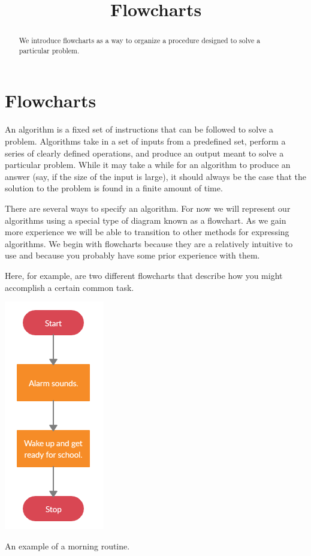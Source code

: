 \documentclass{ximera}
\title{Flowcharts}
\begin{document}
  
\begin{abstract}  
We introduce flowcharts as a way to organize a procedure designed to solve a particular problem.
\end{abstract}  
\maketitle

\section{Flowcharts}
An algorithm is a fixed set of instructions that can be followed to solve a problem. Algorithms take in a set of inputs from a predefined set, perform a series of clearly defined operations, and produce an output meant to solve a particular problem. While it may take a while for an algorithm to produce an answer (say, if the size of the input is large), it should always be the case that the solution to the problem is found in a finite amount of time.

There are several ways to specify an algorithm. For now we will represent our algorithms using a special type of diagram known as a flowchart. As we gain more experience we will be able to transition to other methods for expressing algorithms. We begin with flowcharts because they are a relatively intuitive to use and because you probably have some prior experience with them.

Here, for example, are two different flowcharts that describe how you might accomplish a certain common task. 

\begin{center}
	\includegraphics{morning1.png}
\end{center}
\begin{center}
	An example of a morning routine.
\end{center}
\end{document}
